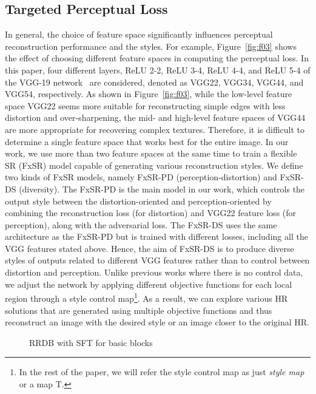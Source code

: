 \documentclass{article}
\begin{document}
\subsection{Targeted Perceptual Loss}
In general, the choice of feature space significantly influences perceptual reconstruction performance and the styles. For example, Figure~\ref{fig:f03} shows the effect of choosing different feature spaces in computing the perceptual loss. In this paper, four different layers, ReLU 2-2, ReLU 3-4, ReLU 4-4, and ReLU 5-4 of the VGG-19 network~\cite{SimonyanZ14a} are considered, denoted as VGG22, VGG34, VGG44, and VGG54, respectively. As shown in Figure~\ref{fig:f03}, while the low-level feature space VGG22 seems more suitable for reconstructing simple edges with less distortion and over-sharpening, the mid- and high-level feature spaces of VGG44 are more appropriate for recovering complex textures. Therefore, it is difficult to determine a single feature space that works best for the entire image.
In our work, we use more than two feature spaces at the same time to train a flexible SR (FxSR) model capable of generating various reconstruction styles. We define two kinds of FxSR models, namely FxSR-PD (perception-distortion) and FxSR-DS (diversity). The FxSR-PD is the main model in our work, which controls the output style between the distortion-oriented and perception-oriented by combining the reconstruction loss (for distortion) and VGG22 feature loss (for perception), along with the adversarial loss. The FxSR-DS uses the same architecture as the FxSR-PD but is trained with different losses, including all the VGG features stated above. Hence, the aim of FxSR-DS is to produce diverse styles of outputs related to different VGG features rather than to control between distortion and perception. Unlike previous works where there is no control data, we adjust the network by applying different objective functions for each local region through a style control map\footnote{In the rest of the paper, we will refer the style control map as just {\em style map} or a map T.}. As a result, we can explore various HR solutions that are generated using multiple objective functions and thus reconstruct an image with the desired style or an image closer to the original HR.
\begin{figure}[!t]
\centering
\scriptsize
\begin{minipage}[t]{1.0\linewidth}
    \centering
    \hfill
    \vfill
    \vfill
\end{minipage}
\caption{RRDB with SFT for basic blocks}
\label{fig:f05}
\end{figure}
\end{document}
